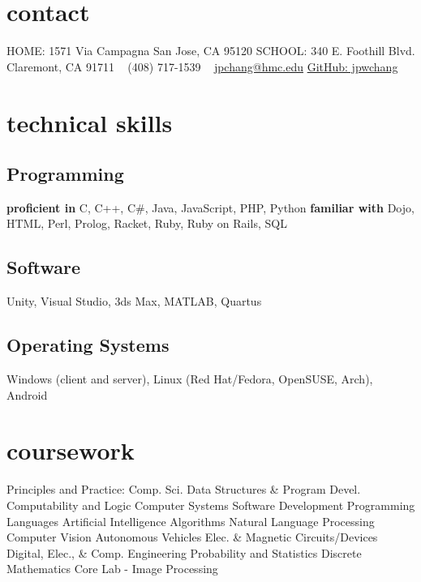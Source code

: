 \documentclass[]{friggeri-cv} %
\begin{document}


\begin{aside} %
\section{contact}
HOME:
1571 Via Campagna
San Jose, CA 95120
SCHOOL:
340 E. Foothill Blvd.
Claremont, CA 91711
~
(408) 717-1539
~
\href{mailto:jpchang@hmc.edu}{jpchang@hmc.edu}
\href{https://github.com/jpwchang}{GitHub: jpwchang}
\section{technical skills}
\subsection{Programming}
\textbf{proficient in}
C, C++, C\#, Java, JavaScript, PHP, Python
\textbf{familiar with}
Dojo, HTML, Perl, Prolog, Racket, Ruby, Ruby on Rails, SQL
\subsection{Software}
Unity, Visual Studio, 3ds Max, MATLAB, Quartus
\subsection{Operating Systems}
Windows (client and server), Linux (Red Hat/Fedora, OpenSUSE, Arch), Android
\section{coursework}
Principles and Practice: Comp. Sci.
Data Structures \& Program Devel.
Computability and Logic
Computer Systems
Software Development
Programming Languages
Artificial Intelligence
Algorithms
Natural Language Processing
Computer Vision
Autonomous Vehicles
Elec. \& Magnetic Circuits/Devices
Digital, Elec., \& Comp. Engineering
Probability and Statistics
Discrete Mathematics
Core Lab - Image Processing
\end{aside}
\end{document}
